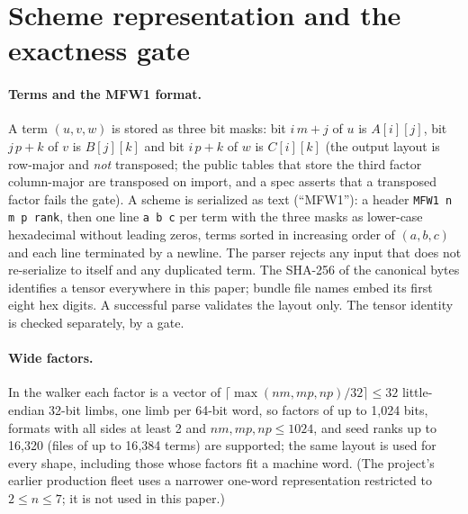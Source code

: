 \section{Scheme representation and the exactness gate}\label{sec:repr}

\paragraph{Terms and the MFW1 format.}
A term $(u,v,w)$ is stored as three bit masks: bit $i\,m+j$ of $u$ is $A[i][j]$, bit $j\,p+k$ of $v$ is $B[j][k]$ and bit $i\,p+k$ of $w$ is
$C[i][k]$ (the output layout is row-major and \emph{not} transposed; the public tables that store the third factor column-major are
transposed on import, and a spec asserts that a transposed factor fails the gate).
A scheme is serialized as text (``MFW1''): a header \texttt{MFW1 n m p rank}, then one line \texttt{a b c} per term with the
three masks as lower-case hexadecimal without leading zeros, terms sorted in increasing order of $(a,b,c)$ and each line
terminated by a newline. The parser rejects any input that does not re-serialize to itself and any duplicated term.
The SHA-256 of the canonical bytes identifies a tensor everywhere in this paper; bundle file names embed its first eight hex digits.
A successful parse validates the layout only. The tensor identity is checked separately, by a gate.

\paragraph{Wide factors.}
In the walker each factor is a vector of $\lceil\max(nm,mp,np)/32\rceil\le 32$ little-endian 32-bit limbs, one limb per 64-bit word, so
factors of up to 1{,}024 bits, formats with all sides at least 2 and $nm,mp,np\le1024$, and seed ranks up to 16{,}320 (files of up to 16{,}384 terms) are supported; the same
layout is used for every shape, including those whose factors fit a machine word.
(The project's earlier production fleet uses a narrower one-word representation restricted to $2\le n\le7$; it is not used in this paper.)

